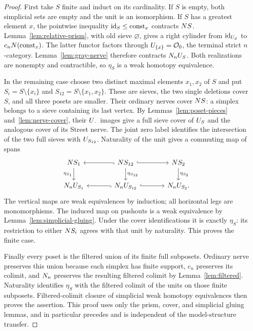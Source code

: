 \begin{proof}
First take $S$ finite and induct on its cardinality.  If $S$ is
empty, both simplicial sets are empty and the unit is an
isomorphism.  If $S$ has a greatest element $x$, the pointwise
inequality $\mathrm{id}_S\le\mathrm{const}_x$ contracts $N S$.
Lemma~\ref{lem:relative-prism}, with old sieve $\varnothing$, gives
a right cylinder from $\mathrm{id}_{U_{S}}$ to
$c_nN(\mathrm{const}_x)$.  The latter functor factors through
$U_{\{x\}}=\mathcal O_{0}$, the terminal strict $n$-category.
Lemma~\ref{lem:gray-nerve} therefore contracts
$N_nU_{S}$.  Both realizations are nonempty and contractible,
so $\eta_S$ is a weak homotopy equivalence.

In the remaining case choose two distinct maximal elements
$x_1,x_2$ of $S$ and put
$S_i=S\setminus\{x_i\}$ and
$S_{12}=S\setminus\{x_1,x_2\}$.  These are sieves, the two single
deletions cover $S$, and all three posets are smaller.  Their
ordinary nerves cover $N S$: a simplex belongs to a sieve
containing its last vertex.  By
Lemmas~\ref{lem:poset-pieces} and~\ref{lem:nerve-cover}, their
$U_{\,\cdot\,}$ images give a full sieve cover of $U_{S}$ and
the analogous cover of its Street nerve.  The joint zero label
identifies the intersection of the two full sieves with
$U_{S_{12}}$.  Naturality of the unit
gives a commuting map of spans
\[
\begin{tikzcd}[column sep=large]
 \OrdN S_1 \arrow[d,"\eta_{S_1}"'] &
 \OrdN S_{12} \arrow[l,hook] \arrow[r,hook]
             \arrow[d,"\eta_{S_{12}}"] &
 \OrdN S_2 \arrow[d,"\eta_{S_2}"] \\
 \Street\U{S_1} &
 \Street\U{S_{12}} \arrow[l,hook] \arrow[r,hook] &
 \Street\U{S_2} .
\end{tikzcd}
\]
The vertical maps are weak equivalences by induction; all horizontal
legs are monomorphisms.  The induced map on pushouts is a weak
equivalence by Lemma~\ref{lem:simplicial-gluing}.  Under the cover
identifications it is exactly $\eta_S$: its restriction to either
$N S_i$ agrees with that unit by naturality.  This proves the
finite case.

Finally every poset is the filtered union of its finite full
subposets.  Ordinary nerve preserves this union because each
simplex has finite support, $c_n$ preserves its colimit, and
$N_n$ preserves the resulting filtered colimit by
Lemma~\ref{lem:filtered}.  Naturality identifies $\eta_S$ with the
filtered colimit of the units on those finite subposets.
Filtered-colimit closure of simplicial weak homotopy equivalences
then proves the assertion.  This proof uses only the prism, cover,
and simplicial gluing lemmas, and in particular precedes and is
independent of the model-structure transfer.
\end{proof}
